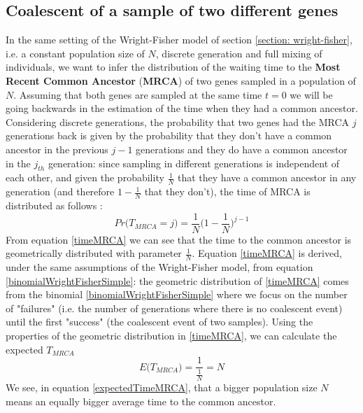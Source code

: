 \documentclass[12pt,mythesisstyle]{report}
\begin{document}
\subsection{Coalescent of a sample of two different genes}\label{section: coalescenttwogenes}
In the same setting of the Wright-Fisher model of section \ref{section: wright-fisher}, i.e. a constant population size of $N$, discrete generation and full mixing of individuals, we want to infer the distribution of the waiting time to the \textbf{Most Recent Common Ancestor} (\textbf{MRCA}) of two genes sampled in a population of $N$. Assuming that both genes are sampled at the same time $t=0$ we will be going backwards in the estimation of the time when they had a common ancestor. Considering discrete generations, the probability that two genes had the MRCA $j$ generations back is given by the probability that they don't have a common ancestor in the previous $j-1$ generations and they do have a common ancestor in the $j_{th}$ generation: since sampling in different generations is independent of each other, and given the probability $\frac{1}{N}$ that they have a common ancestor in any generation (and therefore $1-\frac{1}{N}$ that they don't), the time of MRCA is distributed as follows \cite{coalescentPrimer} :
\begin{equation}\label{timeMRCA}
Pr\big(T_{MRCA}=j\big)=\frac{1}{N}\big(1-\frac{1}{N}\big)^{j-1}
\end{equation} 
From equation \eqref{timeMRCA} we can see that the time to the common ancestor is geometrically distributed with parameter $\frac{1}{N}$. Equation \eqref{timeMRCA} is derived, under the same assumptions of the Wright-Fisher model, from equation \eqref{binomialWrightFisherSimple}: the geometric distribution of \eqref{timeMRCA} comes from the binomial \eqref{binomialWrightFisherSimple} where we focus on the number of "failures" (i.e. the number of generations where there is no coalescent event) until the first "success" (the coalescent event of two samples). Using the properties of the geometric distribution in \eqref{timeMRCA}, we can calculate the expected $T_{MRCA}$
\begin{equation}\label{expectedTimeMRCA}
E\big(T_{MRCA}\big)=\frac{1}{\frac{1}{N}}=N
\end{equation} 
We see, in equation \eqref{expectedTimeMRCA}, that a bigger population size $N$ means an equally bigger average time to the common ancestor.
\end{document}
